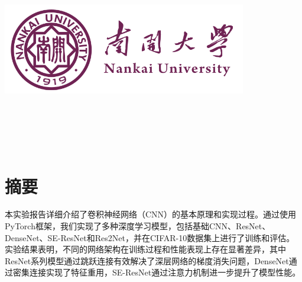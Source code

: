 \documentclass[12pt,a4paper]{article}
\begin{document}
\renewcommand{\contentsname}{目\ 录}
\renewcommand{\appendixname}{附录}
\renewcommand{\appendixpagename}{附录}
\renewcommand{\refname}{参考文献} 
\renewcommand{\figurename}{图}
\renewcommand{\tablename}{表}
\renewcommand{\today}{\number\year 年 \number\month 月 \number\day 日}

\begin{titlepage}
    \begin{center}
    \includegraphics[width=0.8\textwidth]{NKU.png}\\[1cm]
    \vspace{20mm}
		\textbf{\huge\textbf{}}\\[0.5cm]
		\textbf{\Huge\textbf{}}

		\vspace{\fill}
    \centering
    \textsc{\LARGE {}}\\[0.5cm]
    \textsc{\LARGE {}}\\[0.5cm]
    \textsc{\LARGE {}}\\[0.5cm]
    \vfill
    {\Large }
    \end{center}
\end{titlepage}

\renewcommand {\thefigure}{\thesection{}.\arabic{figure}}%
\renewcommand{\figurename}{图}
\renewcommand{\contentsname}{目录}  

\clearpage
\tableofcontents
\newpage

\section*{摘要}
本实验报告详细介绍了卷积神经网络（CNN）的基本原理和实现过程。通过使用PyTorch框架，我们实现了多种深度学习模型，包括基础CNN、ResNet、DenseNet、SE-ResNet和Res2Net，并在CIFAR-10数据集上进行了训练和评估。实验结果表明，不同的网络架构在训练过程和性能表现上存在显著差异，其中ResNet系列模型通过跳跃连接有效解决了深层网络的梯度消失问题，DenseNet通过密集连接实现了特征重用，SE-ResNet通过注意力机制进一步提升了模型性能。
\end{document}
